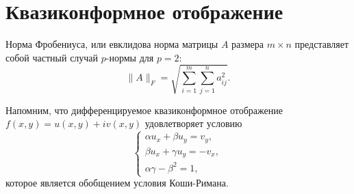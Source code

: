 \documentclass[a4paper,11pt,twoside]{article}
\begin{document}
\section{Квазиконформное отображение}
\begin{dfn}
Норма Фробениуса, или евклидова норма \cite{Shur-IK} матрицы $A$ размера $m \times n$ представляет собой частный случай $p$-нормы для $p = 2$: 
$$\|A\|_{F}={\sqrt {\sum _{i=1}^{m}\sum _{j=1}^{n}a_{ij}^{2}}}.$$
\end{dfn}	

Напомним, что дифференцируемое квазиконформное отображение $f(x,y)=u(x,y)+iv(x,y)$ удовлетворяет условию \cite{Shur-Volk}
$$
\begin{cases}
\alpha u_x+\beta u_y=v_y,\\
\beta u_x + \gamma u_y=-v_x,\\
\alpha \gamma - \beta ^2=1,
\end{cases}$$
которое является обобщением условия Коши-Римана.
\end{document}
